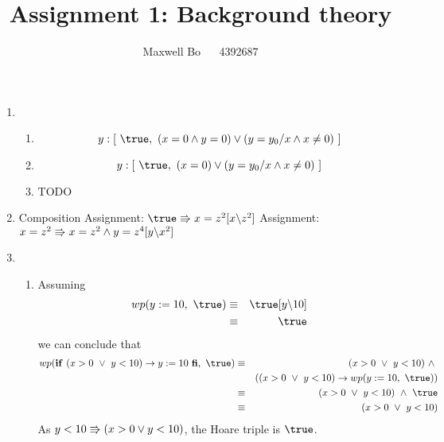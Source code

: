 \documentclass{article}
\title{\bf Assignment 1: Background theory}
\author{Maxwell Bo  ~~ 4392687}
\begin{document}
\maketitle

\begin{enumerate}
    \item 
        \begin{enumerate}
            \item \[ y: [\ \true,\ (x = 0 \land y = 0) \lor (y = y_0 / x \land x \neq 0)\ ]\]
            \item \[ y: [\ \true,\ (x = 0) \lor (y = y_0 / x \land x \neq 0)\ ]\]
            \item TODO
        \end{enumerate}

    \item 
        \DERIVE
         {Composition}
         {Assignment: $\true \entails x = z^2 [x \backslash z^2]$}
         {Assignment: $x = z^2 \Rrightarrow x = z^2 \land y = z ^ 4[y \backslash x^2]$}
        \ENDDERIVE

    \item
        \begin{enumerate}
            \item Assuming
                \begin{eqnarray*}
                    wp(y := 10,\ \true) & \equiv & \true[y \backslash 10]\\
                                       & \equiv & \true
                \end{eqnarray*} 
                    we can conclude that 
                \begin{eqnarray*}
                    wp(\If~ (x > 0 ~\lor~ y < 10) \rightarrow y:= 10\ \Fi,\ \true) & \equiv & (x > 0 ~\lor~ y < 10) ~\land~ \\
                        & & ((x > 0 ~\lor~ y < 10) \rightarrow wp(y := 10,\ \true))\\
                    & \equiv & (x > 0 ~\lor~ y < 10) ~\land~ \true\\
                    & \equiv & (x > 0 ~\lor~ y < 10)
                \end{eqnarray*}
                As $y < 10 \Rrightarrow (x > 0 \lor y < 10)$, the Hoare triple is $\true$.


\end{enumerate}
\end{enumerate}
\end{document}
